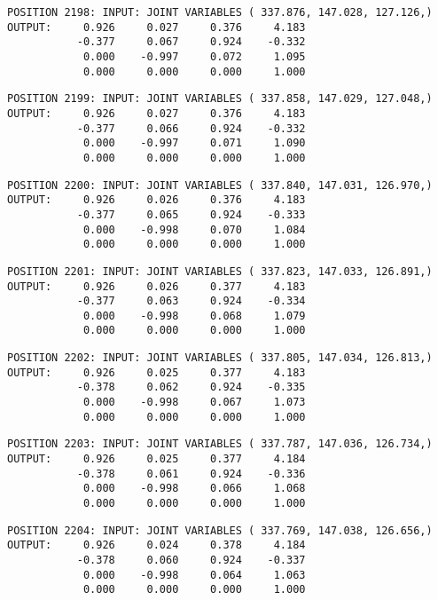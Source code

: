 \begin{verbatim}
POSITION 2198: INPUT: JOINT VARIABLES ( 337.876, 147.028, 127.126,)
OUTPUT:     0.926     0.027     0.376     4.183
           -0.377     0.067     0.924    -0.332
            0.000    -0.997     0.072     1.095
            0.000     0.000     0.000     1.000
\end{verbatim} \pagebreak[1]\begin{verbatim}
POSITION 2199: INPUT: JOINT VARIABLES ( 337.858, 147.029, 127.048,)
OUTPUT:     0.926     0.027     0.376     4.183
           -0.377     0.066     0.924    -0.332
            0.000    -0.997     0.071     1.090
            0.000     0.000     0.000     1.000
\end{verbatim} \pagebreak[1]\begin{verbatim}
POSITION 2200: INPUT: JOINT VARIABLES ( 337.840, 147.031, 126.970,)
OUTPUT:     0.926     0.026     0.376     4.183
           -0.377     0.065     0.924    -0.333
            0.000    -0.998     0.070     1.084
            0.000     0.000     0.000     1.000
\end{verbatim} \pagebreak[1]\begin{verbatim}
POSITION 2201: INPUT: JOINT VARIABLES ( 337.823, 147.033, 126.891,)
OUTPUT:     0.926     0.026     0.377     4.183
           -0.377     0.063     0.924    -0.334
            0.000    -0.998     0.068     1.079
            0.000     0.000     0.000     1.000
\end{verbatim} \pagebreak[1]\begin{verbatim}
POSITION 2202: INPUT: JOINT VARIABLES ( 337.805, 147.034, 126.813,)
OUTPUT:     0.926     0.025     0.377     4.183
           -0.378     0.062     0.924    -0.335
            0.000    -0.998     0.067     1.073
            0.000     0.000     0.000     1.000
\end{verbatim} \pagebreak[1]\begin{verbatim}
POSITION 2203: INPUT: JOINT VARIABLES ( 337.787, 147.036, 126.734,)
OUTPUT:     0.926     0.025     0.377     4.184
           -0.378     0.061     0.924    -0.336
            0.000    -0.998     0.066     1.068
            0.000     0.000     0.000     1.000
\end{verbatim} \pagebreak[1]\begin{verbatim}
POSITION 2204: INPUT: JOINT VARIABLES ( 337.769, 147.038, 126.656,)
OUTPUT:     0.926     0.024     0.378     4.184
           -0.378     0.060     0.924    -0.337
            0.000    -0.998     0.064     1.063
            0.000     0.000     0.000     1.000
\end{verbatim} \pagebreak[1]\begin{verbatim}

\end{verbatim}
